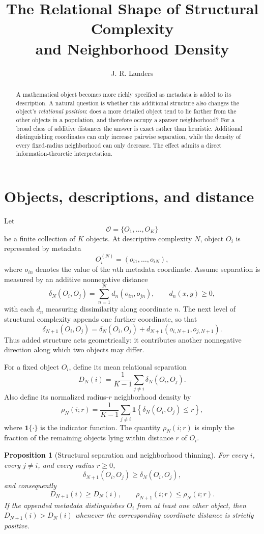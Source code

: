 \documentclass[10.5pt]{article}
\title{\vspace{-2.3em}\textbf{The Relational Shape of Structural Complexity\\and Neighborhood Density}}
\author{J. R. Landers}
\date{}
\newtheorem{proposition}{Proposition}
\begin{document}
\maketitle
\vspace{-1.25em}

\begin{abstract}
A mathematical object becomes more richly specified as metadata is added to its description. A natural question is whether this additional structure also changes the object's \emph{relational position}: does a more detailed object tend to lie farther from the other objects in a population, and therefore occupy a sparser neighborhood? For a broad class of additive distances the answer is exact rather than heuristic. Additional distinguishing coordinates can only increase pairwise separation, while the density of every fixed-radius neighborhood can only decrease. The effect admits a direct information-theoretic interpretation.
\end{abstract}

\section*{Objects, descriptions, and distance}
Let
\[
\mathcal O=\{O_1,\ldots,O_K\}
\]
be a finite collection of $K$ objects. At descriptive complexity $N$, object $O_i$ is represented by metadata
\[
O_i^{(N)}=(o_{i1},\ldots,o_{iN}),
\]
where $o_{in}$ denotes the value of the $n$th metadata coordinate. Assume separation is measured by an additive nonnegative distance
\[
\delta_N(O_i,O_j)=\sum_{n=1}^{N} d_n(o_{in},o_{jn}),
\qquad d_n(x,y)\ge 0,
\]
with each $d_n$ measuring dissimilarity along coordinate $n$. The next level of structural complexity appends one further coordinate, so that
\[
\delta_{N+1}(O_i,O_j)
=\delta_N(O_i,O_j)+d_{N+1}(o_{i,N+1},o_{j,N+1}).
\]
Thus added structure acts geometrically: it contributes another nonnegative direction along which two objects may differ.

For a fixed object $O_i$, define its mean relational separation
\[
D_N(i)=\frac{1}{K-1}\sum_{j\ne i}\delta_N(O_i,O_j).
\]
Also define its normalized radius-$r$ neighborhood density by
\[
\rho_N(i;r)=\frac{1}{K-1}\sum_{j\ne i}
\mathbf 1\!\left\{\delta_N(O_i,O_j)\le r\right\},
\]
where $\mathbf 1\{\cdot\}$ is the indicator function. The quantity $\rho_N(i;r)$ is simply the fraction of the remaining objects lying within distance $r$ of $O_i$.

\begin{proposition}[Structural separation and neighborhood thinning]
For every $i$, every $j\ne i$, and every radius $r\ge 0$,
\[
\delta_{N+1}(O_i,O_j)\ge \delta_N(O_i,O_j),
\]
and consequently
\[
D_{N+1}(i)\ge D_N(i),
\qquad
\rho_{N+1}(i;r)\le \rho_N(i;r).
\]
If the appended metadata distinguishes $O_i$ from at least one other object, then $D_{N+1}(i)>D_N(i)$ whenever the corresponding coordinate distance is strictly positive.
\end{proposition}
\end{document}
